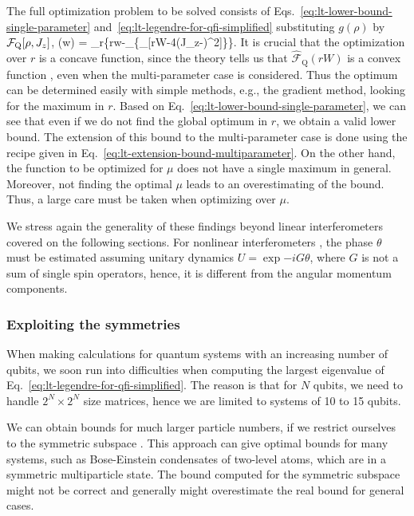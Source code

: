 The full optimization problem to be solved consists of Eqs.~\eqref{eq:lt-lower-bound-single-parameter} and~\eqref{eq:lt-legendre-for-qfi-simplified} substituting $g(\rho)$ by $\mathcal{F}_{\textnormal{Q}}[{\textstyle \rho,J_z}]$,
\be
  (w) = \sup_r\big\{rw-\sup_{\mu}\{\lambda_{\max}[rW-4(J_z-\mu)^2]\}\big\}.
  \label{eq:lt-bound-for-qfi}
\ee
It is crucial that the optimization over $r$ is a concave function, since the theory tells us that $\hat{\mathcal{F}}_{\text{Q}}(rW)$ is a convex function \cite{Rockafellar1996}, even when the multi-parameter case is considered.
Thus the optimum can be determined easily with simple methods, e.g., the gradient method, looking for the maximum in $r$.
Based on Eq.~\eqref{eq:lt-lower-bound-single-parameter}, we can see that even if we do not find the global optimum in $r$, we obtain a valid lower bound.
The extension of this bound to the multi-parameter case is done using the recipe given in Eq.~\eqref{eq:lt-extension-bound-multiparameter}.
On the other hand, the function to be optimized for $\mu$ does not have a single maximum in general.
Moreover, not finding the optimal $\mu$ leads to an overestimating of the bound.
Thus, a large care must be taken when optimizing over $\mu$.

We stress again the generality of these findings beyond linear interferometers covered on the following sections.
For nonlinear interferometers \cite{Luis2004, Boixo2007, Choi2008, Roy2008, Napolitano2011, Hall2012}, the phase $\theta$ must be estimated assuming unitary dynamics $U=\exp{-iG\theta}$, where $G$ is not a sum of single spin operators, hence, it is different from the angular momentum components.

\subsubsection{Exploiting the symmetries}
\label{sec:lt-symmetries}

When making calculations for quantum systems with an increasing number of qubits, we soon run into difficulties when computing the largest eigenvalue of Eq.~\eqref{eq:lt-legendre-for-qfi-simplified}.
The reason is that for $N$ qubits, we need to handle $2^N \times 2^N$ size matrices, hence we are limited to systems of 10 to 15 qubits.

We can obtain bounds for much larger particle numbers, if we restrict ourselves to the symmetric subspace \cite{Toth2007, Toth2009a}.
This approach can give optimal bounds for many systems, such as Bose-Einstein condensates of two-level atoms, which are in a symmetric multiparticle state.
The bound computed for the symmetric subspace might not be correct and generally might overestimate the real bound for general cases.

